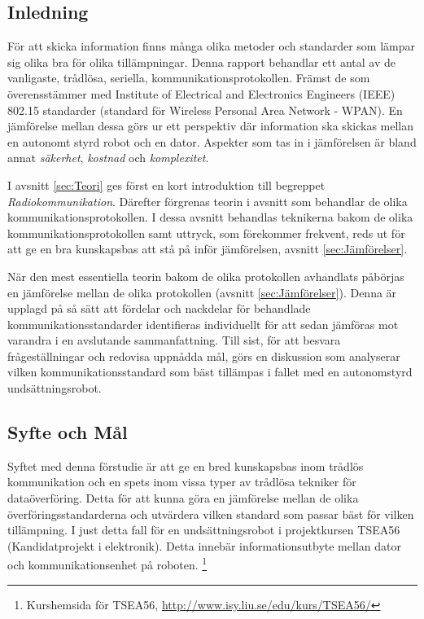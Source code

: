 \documentclass[11pt]{article}
\begin{document}
\begin{flushleft}
\section{Inledning} %
För att skicka information finns många olika metoder och standarder som lämpar sig olika bra för olika tillämpningar. Denna rapport behandlar ett antal av de vanligaste, trådlösa, seriella, kommunikationsprotokollen. Främst de som överensstämmer med Institute of Electrical and Electronics Engineers (IEEE) 802.15 standarder (standard för Wireless Personal Area Network - WPAN). En jämförelse mellan dessa görs ur ett perspektiv där information ska skickas mellan en autonomt styrd robot och en dator. Aspekter som tas in i jämförelsen är bland annat \textit{säkerhet}, \textit{kostnad} och \textit{komplexitet}.\\\bigskip

I avsnitt \ref{sec:Teori} ges först en kort introduktion till begreppet \textit{Radiokommunikation}. Därefter förgrenas teorin i avsnitt som behandlar de olika kommunikationsprotokollen. I dessa avsnitt behandlas teknikerna bakom de olika kommunikationsprotokollen samt uttryck, som förekommer frekvent, reds ut för att ge en bra kunskapsbas att stå på inför jämförelsen, avsnitt \ref{sec:Jämförelser}. \\\bigskip

När den mest essentiella teorin bakom de olika protokollen avhandlats påbörjas en jämförelse mellan de olika protokollen (avsnitt \ref{sec:Jämförelser}). Denna är upplagd på så sätt att fördelar och nackdelar för behandlade kommunikationsstandarder identifieras individuellt för att sedan jämföras mot varandra i en avslutande sammanfattning. Till sist, för att besvara frågeställningar och redovisa uppnådda mål, görs en diskussion som analyserar vilken kommunikationsstandard som bäst tillämpas i fallet med en autonomstyrd undsättningsrobot.

\subsection{Syfte och Mål}
Syftet med denna förstudie är att ge en bred kunskapsbas inom trådlös kommunikation och en spets inom vissa typer av trådlösa tekniker för dataöverföring. Detta för att kunna göra en jämförelse mellan de olika överföringsstandarderna och utvärdera vilken standard som passar bäst för vilken tillämpning. I just detta fall för en undsättningsrobot i projektkursen TSEA56 (Kandidatprojekt i elektronik). Detta innebär informationsutbyte mellan dator och kommunikationsenhet på roboten.
\footnote{Kurshemsida för TSEA56, \url{http://www.isy.liu.se/edu/kurs/TSEA56/}} \\\bigskip


\end{flushleft}
\end{document}
